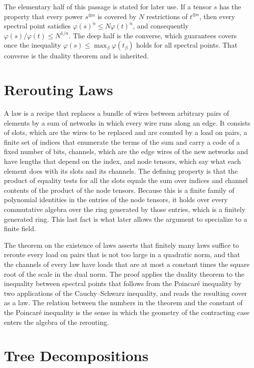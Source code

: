 \documentclass[11pt,letterpaper]{report}
\theoremstyle{plain}
\theoremstyle{definition}
\theoremstyle{remark}
\begin{document}
The elementary half of this passage is stated for later use. If a tensor $s$ has the property that every power $s^{\otimes n}$ is covered by $N$ restrictions of $t^{\otimes n}$, then every spectral point satisfies $\varphi(s)^n\le N\varphi(t)^n$, and consequently $\varphi(s)/\varphi(t)\le N^{1/n}$. The deep half is the converse, which guarantees covers once the inequality $\varphi(s)\le\max_\beta\varphi(t_\beta)$ holds for all spectral points. That converse is the duality theorem and is inherited.

\section{Rerouting Laws}

A law is a recipe that replaces a bundle of wires between arbitrary pairs of elements by a sum of networks in which every wire runs along an edge. It consists of slots, which are the wires to be replaced and are counted by a load on pairs, a finite set of indices that enumerate the terms of the sum and carry a code of a fixed number of bits, channels, which are the edge wires of the new networks and have lengths that depend on the index, and node tensors, which say what each element does with its slots and its channels. The defining property is that the product of equality tests for all the slots equals the sum over indices and channel contents of the product of the node tensors. Because this is a finite family of polynomial identities in the entries of the node tensors, it holds over every commutative algebra over the ring generated by those entries, which is a finitely generated ring. This last fact is what later allows the argument to specialize to a finite field.

The theorem on the existence of laws asserts that finitely many laws suffice to reroute every load on pairs that is not too large in a quadratic norm, and that the channels of every law have loads that are at most a constant times the square root of the scale in the dual norm. The proof applies the duality theorem to the inequality between spectral points that follows from the Poincar\'e inequality by two applications of the Cauchy--Schwarz inequality, and reads the resulting cover as a law. The relation between the numbers in the theorem and the constant of the Poincar\'e inequality is the sense in which the geometry of the contracting case enters the algebra of the rerouting.

\section{Tree Decompositions}
\end{document}
